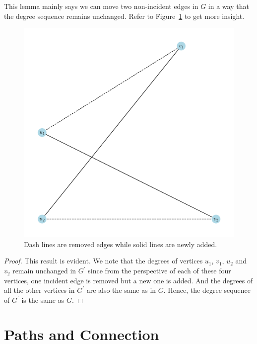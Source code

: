 \documentclass[thmcnt=section, 12pt, color=cyan]{my-elegantbook}
\begin{document}
This lemma mainly says we can move two 
non-incident edges in $G$ in a way that 
the degree sequence remains unchanged.
Refer to Figure~\ref{fig:7} to get more insight.

\begin{figure}[ht]
	\centering
	\includegraphics[scale=0.5]{figures/g-007.png}
	\caption{
		Dash lines are removed edges while
		solid lines are newly added.
	}
	\label{fig:7}
\end{figure}

\begin{proof}
	This result is evident. 
	We note that the degrees of vertices 
	$u_1$, $v_1$, $u_2$ and $v_2$ remain unchanged
	in $G^\prime$ since from the perspective of 
	each of these four vertices,
	one incident edge is removed but a new one is added.
	And the degrees of all the other vertices in $G^\prime$
	are also the same as in $G$.
	Hence, the degree sequence of $G^\prime$ is the same as $G$.
\end{proof}


\section{Paths and Connection}

\end{document}
